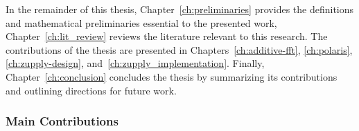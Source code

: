 %

In the remainder of this thesis, Chapter~\ref{ch:preliminaries} provides the definitions and mathematical preliminaries essential to the presented work, Chapter~\ref{ch:lit_review} reviews the literature relevant to this research.  The contributions of the thesis are presented in Chapters~\ref{ch:additive-fft}, \ref{ch:polaris}, \ref{ch:zupply-design}, and~\ref{ch:zupply_implementation}.  Finally, Chapter~\ref{ch:conclusion} concludes the thesis by summarizing its contributions and outlining directions for future work.

\subsubsection{Main Contributions}

